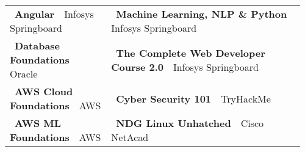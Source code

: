 \documentclass[10pt,a4paper]{article}
\begin{document}
	\begin{tabular}{p{0.33\linewidth} p{0.63\linewidth}}
		\textbullet\ \textbf{Angular}\, \textbar \, Infosys Springboard & \textbullet\ \textbf{Machine Learning, NLP \& Python}\, \textbar \, Infosys Springboard \\
		\textbullet\ \textbf{Database Foundations}\, \textbar \, Oracle  & \textbullet\ \textbf{The Complete Web Developer Course 2.0}\, \textbar \, Infosys Springboard \\
		\textbullet\ \textbf{AWS Cloud Foundations}\, \textbar \, AWS & \textbullet\ \textbf{Cyber Security 101}\, \textbar \, TryHackMe \\
		\textbullet\ \textbf{AWS ML Foundations}\, \textbar \, AWS & \textbullet\ \textbf{NDG Linux Unhatched}\, \textbar \, Cisco NetAcad\\
	\end{tabular}
	
	
	
	
\end{document}
